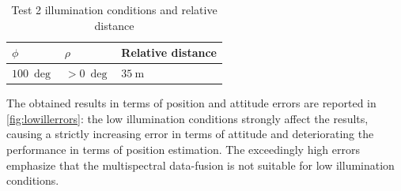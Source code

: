 \begin{table}[!h]
    \centering
    \begin{tabular}{C{1.8cm} C{1.8cm} C{4cm}}
     $\phi$ & $\rho$ & Relative distance\\ \hline\hline
     $\SI{100}{\deg}$ & $>\SI{0}{\deg}$ & $\SI{35}{\meter}$\\\hline
   
    \end{tabular}
    \caption{Test 2 illumination conditions and relative distance}
    \label{tab:contest2}
\end{table}

The obtained results in terms of position and attitude errors are reported in \cref{fig:lowillerrors}: the low illumination conditions strongly affect the results, causing a strictly increasing error in terms of attitude and deteriorating the performance in terms of position estimation. The exceedingly high errors emphasize that the multispectral data-fusion is not suitable for low illumination conditions.\\

